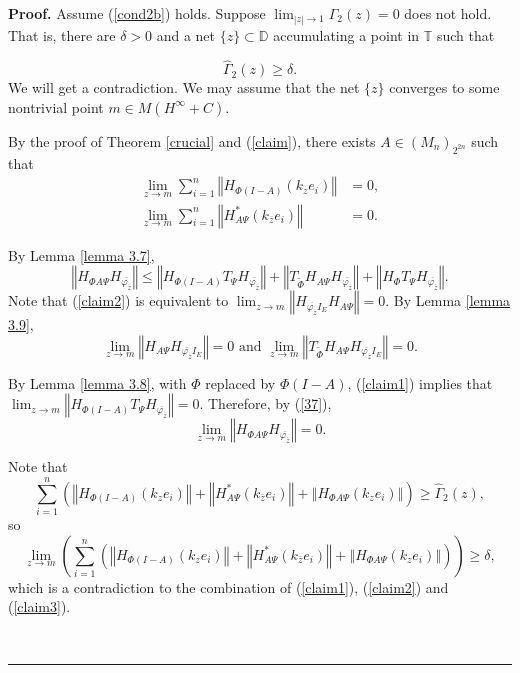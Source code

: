 \documentclass{article}%
\newenvironment{proof}[1][Proof]{\noindent\textbf{#1.} }{\ \rule{0.5em}{0.5em}}
\begin{document}
\begin{proof}
Assume (\ref{cond2b}) holds. Suppose $\lim_{\left\vert z\right\vert
\rightarrow1}\Gamma_{2}(z)=0$ does not hold. That is, there are $\delta>0$ and
a net $\{z\}\subset\mathbb{D}$ accumulating a point in $\mathbb{T}$ such that%

\[
\widehat{\Gamma}_{2}(z)\geq\delta.
\]
We will get a contradiction. We may assume that the net $\{z\}$ converges to
some nontrivial point $m\in M\left(  H^{\infty}+C\right)  $.

By the proof of Theorem \ref{crucial} and (\ref{claim}), there exists
$A\in\left(  M_{n}\right)  _{2^{2n}}$ such that
\begin{align}
\lim_{z\rightarrow m}\sum_{i=1}^{n}\left\Vert H_{\Phi(I-A)}\left(  k_{z}%
e_{i}\right)  \right\Vert  &  =0,\label{claim1}\\
\lim_{z\rightarrow m}\sum_{i=1}^{n}\left\Vert H_{A\Psi}^{\ast}\left(
k_{\overline{z}}e_{i}\right)  \right\Vert  &  =0.\label{claim2}%
\end{align}


By Lemma \ref{lemma 3.7},
\begin{equation}
\left\Vert H_{\Phi A\Psi}H_{\overline{\varphi_{\overline{z}}}}\right\Vert
\leq\left\Vert H_{\Phi(I-A)}T_{\Psi}H_{\overline{\varphi_{\overline{z}}}%
}\right\Vert +\left\Vert T_{\widetilde{\Phi}}H_{A\Psi}H_{\overline
{\varphi_{\overline{z}}}}\right\Vert +\left\Vert H_{\Phi}T_{\Psi}%
H_{\overline{\varphi_{\overline{z}}}}\right\Vert . \label{37}%
\end{equation}
Note that (\ref{claim2}) is equivalent to $\lim_{z\rightarrow m}\left\Vert
H_{\overline{\varphi_{\overline{z}}}I_{E}}H_{A\Psi}\right\Vert =0$. By Lemma
\ref{lemma 3.9},
\[
\lim_{z\rightarrow m}\left\Vert H_{A\Psi}H_{\overline{\varphi_{\overline{z}}%
}I_{E}}\right\Vert =0\text{ and }\lim_{z\rightarrow m}\left\Vert
T_{\widetilde{\Phi}}H_{A\Psi}H_{\overline{\varphi_{\overline{z}}}I_{E}%
}\right\Vert =0.
\]


By Lemma \ref{lemma 3.8}, with $\Phi$ replaced by $\Phi(I-A)$, (\ref{claim1})
implies that $\lim_{z\rightarrow m}\left\Vert H_{\Phi(I-A)}T_{\Psi
}H_{\overline{\varphi_{\overline{z}}}}\right\Vert =0.$ Therefore, by
(\ref{37}),
\begin{equation}
\lim_{z\rightarrow m}\left\Vert H_{\Phi A\Psi}H_{\overline{\varphi
_{\overline{z}}}}\right\Vert =0. \label{claim3}%
\end{equation}


Note that%
\[
\sum_{i=1}^{n}\left(  \left\Vert H_{\Phi(I-A)}\left(  k_{z}e_{i}\right)
\right\Vert +\left\Vert H_{A\Psi}^{\ast}\left(  k_{\overline{z}}e_{i}\right)
\right\Vert +\left\Vert H_{\Phi A\Psi}\left(  k_{z}e_{i}\right)  \right\Vert
\right)  \geq\widehat{\Gamma}_{2}(z),
\]
so
\[
\lim_{z\rightarrow m}\left(  \sum_{i=1}^{n}\left(  \left\Vert H_{\Phi
(I-A)}\left(  k_{z}e_{i}\right)  \right\Vert +\left\Vert H_{A\Psi}^{\ast
}\left(  k_{\overline{z}}e_{i}\right)  \right\Vert +\left\Vert H_{\Phi A\Psi
}\left(  k_{z}e_{i}\right)  \right\Vert \right)  \right)  \geq\delta,
\]
which is a contradiction to the combination of (\ref{claim1}), (\ref{claim2})
and (\ref{claim3}).


\end{proof}
\end{document}

